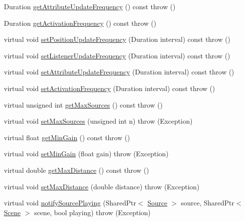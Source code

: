 \begin{DoxyCompactItemize}
\item 
Duration \hyperlink{classAudio_1_1SceneManager_a6d166805028d1a7be8f04b7e4386a068}{get\+Attribute\+Update\+Frequency} () const   throw ()
\item 
Duration \hyperlink{classAudio_1_1SceneManager_a2a2371912f2a9498a26d7f0ada3d6377}{get\+Activation\+Frequency} () const   throw ()
\item 
virtual void \hyperlink{classAudio_1_1SceneManager_adb947e8a2035bec371d4ff4eb7d9e712}{set\+Position\+Update\+Frequency} (Duration interval) const   throw ()
\item 
virtual void \hyperlink{classAudio_1_1SceneManager_a8a5678d908e087acbd3aa07a4162e829}{set\+Listener\+Update\+Frequency} (Duration interval) const   throw ()
\item 
virtual void \hyperlink{classAudio_1_1SceneManager_a47170804f7c8ffd61a8b93ae0ee1c65e}{set\+Attribute\+Update\+Frequency} (Duration interval) const   throw ()
\item 
virtual void \hyperlink{classAudio_1_1SceneManager_a9428fefc09dc6a67bbdac4ab73101b84}{set\+Activation\+Frequency} (Duration interval) const   throw ()
\item 
virtual unsigned int \hyperlink{classAudio_1_1SceneManager_ada6c908febe3db7ce962ef59e2d10a88}{get\+Max\+Sources} () const   throw ()
\item 
virtual void \hyperlink{classAudio_1_1SceneManager_a6a7a27f7a5389dabc38cd811cc4cfec8}{set\+Max\+Sources} (unsigned int n)  throw (\+Exception)
\item 
virtual float \hyperlink{classAudio_1_1SceneManager_a901fe7f9fb268e856b43a07678f44e38}{get\+Min\+Gain} () const   throw ()
\item 
virtual void \hyperlink{classAudio_1_1SceneManager_aef0ca5bd111e683309462c584a70f0e7}{set\+Min\+Gain} (float gain)  throw (\+Exception)
\item 
virtual double \hyperlink{classAudio_1_1SceneManager_a833200116bb80e5d4b19e249cec00980}{get\+Max\+Distance} () const   throw ()
\item 
virtual void \hyperlink{classAudio_1_1SceneManager_ac703b098abc79ea93f2d1e12dbdba063}{set\+Max\+Distance} (double distance)  throw (\+Exception)
\item 
virtual void \hyperlink{classAudio_1_1SceneManager_a103e7f5cdc4c86e422fcfa1913d1a3ac}{notify\+Source\+Playing} (Shared\+Ptr$<$ \hyperlink{classAudio_1_1Source}{Source} $>$ source, Shared\+Ptr$<$ \hyperlink{classAudio_1_1Scene}{Scene} $>$ scene, bool playing)  throw (\+Exception)
\end{DoxyCompactItemize}
